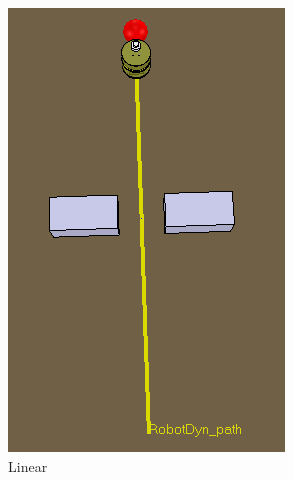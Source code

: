 \begin{figure}[htb!]
  \centering
%
  \begin{subfigure}{.41\textwidth}
  \includegraphics[width=\textwidth]{img/linear.PNG}%
  \caption{Linear}%
  \label{fig:obs-tar-linear-50-1}%
  \end{subfigure}
%
  \begin{subfigure}{.45\textwidth}

\end{subfigure}
\end{figure}
